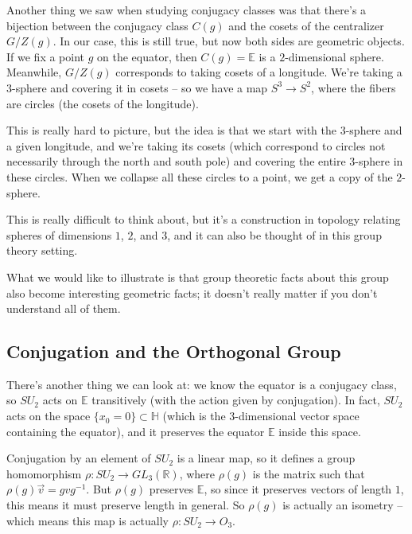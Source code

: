 Another thing we saw when studying conjugacy classes was that there's a bijection between the conjugacy class $C(g)$ and the cosets of the centralizer $G/Z(g)$. In our case, this is still true, but now both sides are geometric objects. If we fix a point $g$ on the equator, then $C(g) = \mathbb{E}$ is a $2$-dimensional sphere. Meanwhile, $G/Z(g)$ corresponds to taking cosets of a longitude. We're taking a $3$-sphere and covering it in cosets -- so we have a map $S^3 \to S^2$, where the fibers are circles (the cosets of the longitude). 

This is really hard to picture, but the idea is that we start with the $3$-sphere and a given longitude, and we're taking its cosets (which correspond to circles not necessarily through the north and south pole) and covering the entire $3$-sphere in these circles. When we collapse all these circles to a point, we get a copy of the $2$-sphere. 

\begin{note}
This is really difficult to think about, but it's a construction in topology relating spheres of dimensions $1$, $2$, and $3$, and it can also be thought of in this group theory setting. 

What we would like to illustrate is that group theoretic facts about this group also become interesting geometric facts; it doesn't really matter if you don't understand all of them. 
\end{note}

\subsection{Conjugation and the Orthogonal Group}

There's another thing we can look at: we know the equator is a conjugacy class, so $SU_2$ acts on $\mathbb{E}$ transitively (with the action given by conjugation). In fact, $SU_2$ acts on the space $\{x_0 = 0\} \subset \mathbb{H}$ (which is the $3$-dimensional vector space containing the equator), and it preserves the equator $\mathbb{E}$ inside this space. 

Conjugation by an element of $SU_2$ is a linear map, so it defines a group homomorphism $\rho : SU_2 \to GL_3(\mathbb{R})$, where $\rho(g)$ is the matrix such that $\rho(g)\vec{v} = gvg^{-1}$. But $\rho(g)$ preserves $\mathbb{E}$, so since it preserves vectors of length $1$, this means it must preserve length in general. So $\rho(g)$ is actually an isometry -- which means this map is actually $\rho : SU_2 \to O_3$. 

